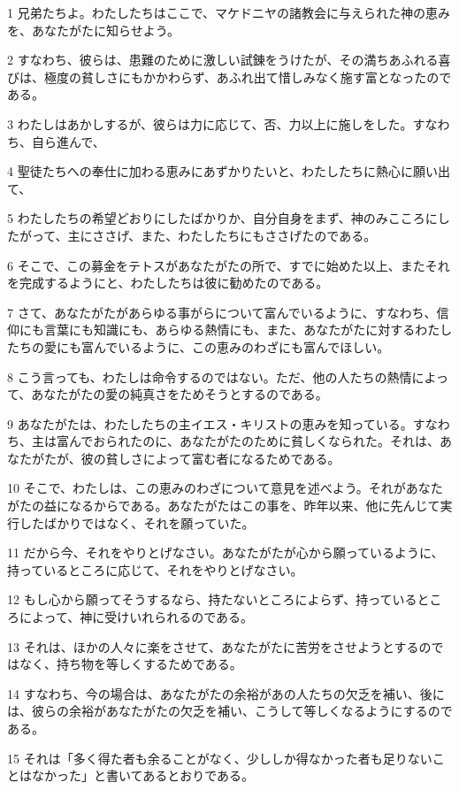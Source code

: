 \par 1 兄弟たちよ。わたしたちはここで、マケドニヤの諸教会に与えられた神の恵みを、あなたがたに知らせよう。
\par 2 すなわち、彼らは、患難のために激しい試錬をうけたが、その満ちあふれる喜びは、極度の貧しさにもかかわらず、あふれ出て惜しみなく施す富となったのである。
\par 3 わたしはあかしするが、彼らは力に応じて、否、力以上に施しをした。すなわち、自ら進んで、
\par 4 聖徒たちへの奉仕に加わる恵みにあずかりたいと、わたしたちに熱心に願い出て、
\par 5 わたしたちの希望どおりにしたばかりか、自分自身をまず、神のみこころにしたがって、主にささげ、また、わたしたちにもささげたのである。
\par 6 そこで、この募金をテトスがあなたがたの所で、すでに始めた以上、またそれを完成するようにと、わたしたちは彼に勧めたのである。
\par 7 さて、あなたがたがあらゆる事がらについて富んでいるように、すなわち、信仰にも言葉にも知識にも、あらゆる熱情にも、また、あなたがたに対するわたしたちの愛にも富んでいるように、この恵みのわざにも富んでほしい。
\par 8 こう言っても、わたしは命令するのではない。ただ、他の人たちの熱情によって、あなたがたの愛の純真さをためそうとするのである。
\par 9 あなたがたは、わたしたちの主イエス・キリストの恵みを知っている。すなわち、主は富んでおられたのに、あなたがたのために貧しくなられた。それは、あなたがたが、彼の貧しさによって富む者になるためである。
\par 10 そこで、わたしは、この恵みのわざについて意見を述べよう。それがあなたがたの益になるからである。あなたがたはこの事を、昨年以来、他に先んじて実行したばかりではなく、それを願っていた。
\par 11 だから今、それをやりとげなさい。あなたがたが心から願っているように、持っているところに応じて、それをやりとげなさい。
\par 12 もし心から願ってそうするなら、持たないところによらず、持っているところによって、神に受けいれられるのである。
\par 13 それは、ほかの人々に楽をさせて、あなたがたに苦労をさせようとするのではなく、持ち物を等しくするためである。
\par 14 すなわち、今の場合は、あなたがたの余裕があの人たちの欠乏を補い、後には、彼らの余裕があなたがたの欠乏を補い、こうして等しくなるようにするのである。
\par 15 それは「多く得た者も余ることがなく、少ししか得なかった者も足りないことはなかった」と書いてあるとおりである。
